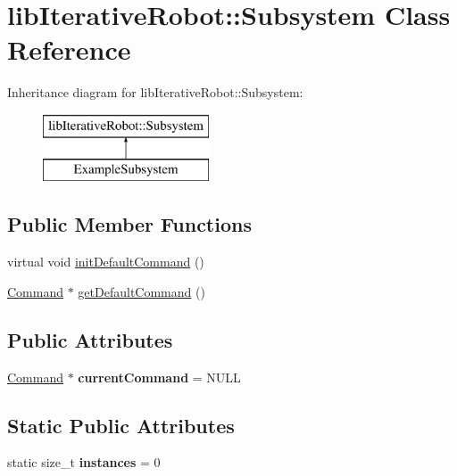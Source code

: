 \hypertarget{classlib_iterative_robot_1_1_subsystem}{}\section{lib\+Iterative\+Robot\+::Subsystem Class Reference}
\label{classlib_iterative_robot_1_1_subsystem}
Inheritance diagram for lib\+Iterative\+Robot\+::Subsystem\+:\begin{figure}[H]
\begin{center}
\leavevmode
\includegraphics[height=2.000000cm]{classlib_iterative_robot_1_1_subsystem}
\end{center}
\end{figure}
\subsection*{Public Member Functions}
\begin{DoxyCompactItemize}
\item 
virtual void \mbox{\hyperlink{classlib_iterative_robot_1_1_subsystem_a30bd6c33c84c896f31ed01c8331aab57}{init\+Default\+Command}} ()
\item 
\mbox{\hyperlink{classlib_iterative_robot_1_1_command}{Command}} $\ast$ \mbox{\hyperlink{classlib_iterative_robot_1_1_subsystem_a7e0c4904d9ff8ad2e4b6bc98d0f9579f}{get\+Default\+Command}} ()
\end{DoxyCompactItemize}
\subsection*{Public Attributes}
\begin{DoxyCompactItemize}
\item 
\mbox{\label{classlib_iterative_robot_1_1_subsystem_a1d64c8d6709433551ab7ac8ab9015f3f}} 
\mbox{\hyperlink{classlib_iterative_robot_1_1_command}{Command}} $\ast$ {\bfseries current\+Command} = N\+U\+LL
\end{DoxyCompactItemize}
\subsection*{Static Public Attributes}
\begin{DoxyCompactItemize}
\item 
\mbox{\label{classlib_iterative_robot_1_1_subsystem_a8520e50bb977676222daa241e757ab33}} 
static size\+\_\+t {\bfseries instances} = 0
\end{DoxyCompactItemize}
